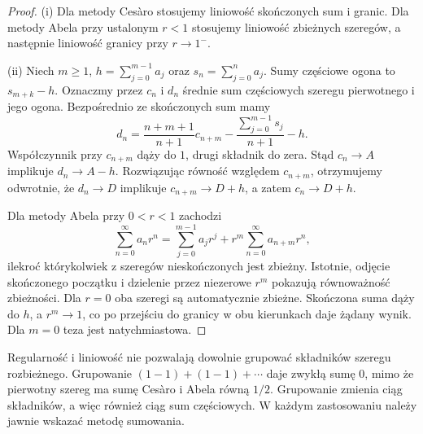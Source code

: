 \begin{proof}
(i) Dla metody Cesàro stosujemy liniowość skończonych sum i granic. Dla metody Abela przy ustalonym $r<1$ stosujemy liniowość zbieżnych szeregów, a następnie liniowość granicy przy $r\to1^-$.

(ii) Niech $m\ge1$, $h=\sum_{j=0}^{m-1}a_j$ oraz $s_n=\sum_{j=0}^n a_j$. Sumy częściowe ogona to $s_{m+k}-h$. Oznaczmy przez $c_n$ i $d_n$ średnie sum częściowych szeregu pierwotnego i jego ogona. Bezpośrednio ze skończonych sum mamy
\[
 d_n=\frac{n+m+1}{n+1}c_{n+m}
 -\frac{\sum_{j=0}^{m-1}s_j}{n+1}-h.
\]
Współczynnik przy $c_{n+m}$ dąży do $1$, drugi składnik do zera. Stąd $c_n\to A$ implikuje $d_n\to A-h$. Rozwiązując równość względem $c_{n+m}$, otrzymujemy odwrotnie, że $d_n\to D$ implikuje $c_{n+m}\to D+h$, a zatem $c_n\to D+h$.

Dla metody Abela przy $0<r<1$ zachodzi
\[
 \sum_{n=0}^\infty a_nr^n
 =\sum_{j=0}^{m-1}a_jr^j+r^m\sum_{n=0}^\infty a_{n+m}r^n,
\]
ilekroć którykolwiek z szeregów nieskończonych jest zbieżny. Istotnie, odjęcie skończonego początku i dzielenie przez niezerowe $r^m$ pokazują równoważność zbieżności. Dla $r=0$ oba szeregi są automatycznie zbieżne. Skończona suma dąży do $h$, a $r^m\to1$, co po przejściu do granicy w obu kierunkach daje żądany wynik. Dla $m=0$ teza jest natychmiastowa.
\end{proof}
\begin{uwaga}
Regularność i liniowość nie pozwalają dowolnie grupować składników szeregu rozbieżnego. Grupowanie $(1-1)+(1-1)+\cdots$ daje zwykłą sumę $0$, mimo że pierwotny szereg ma sumę Cesàro i Abela równą $1/2$. Grupowanie zmienia ciąg składników, a więc również ciąg sum częściowych. W każdym zastosowaniu należy jawnie wskazać metodę sumowania.
\end{uwaga}
